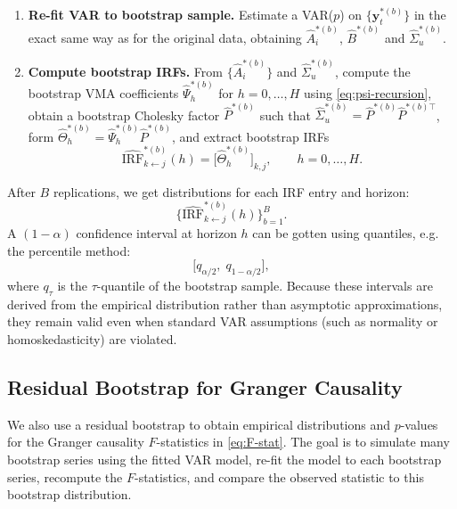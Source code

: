 \documentclass[11pt]{article}
\begin{document}
\begin{enumerate}[leftmargin=1.5em,label=\textbf{(B\arabic*)}]
  \item \textbf{Re-fit VAR to bootstrap sample.}
        Estimate a VAR($p$) on $\{\mathbf{y}_t^{*(b)}\}$ in the exact same
        way as for the original data, obtaining
        $\widehat{A}_i^{*(b)}$, $\widehat{B}^{*(b)}$ and
        $\widehat{\Sigma}_u^{*(b)}$.

  \item \textbf{Compute bootstrap IRFs.}
        From $\{\widehat{A}_i^{*(b)}\}$ and $\widehat{\Sigma}_u^{*(b)}$,
        compute the bootstrap VMA coefficients
        $\widehat{\Psi}_h^{*(b)}$ for $h=0,\dots,H$ using
        \cref{eq:psi-recursion}, obtain a bootstrap Cholesky factor
        $\widehat{P}^{*(b)}$ such that
        $\widehat{\Sigma}_u^{*(b)} = \widehat{P}^{*(b)}
          \widehat{P}^{*(b)\top}$,
        form $\widehat{\Theta}_h^{*(b)} =
          \widehat{\Psi}_h^{*(b)} \widehat{P}^{*(b)}$,
        and extract bootstrap IRFs
        \begin{equation}
          \widehat{\mathrm{IRF}}_{k \leftarrow j}^{*(b)}(h)
          = \big[ \widehat{\Theta}_h^{*(b)} \big]_{k,j},
          \qquad h = 0,\dots,H.
        \end{equation}
\end{enumerate}

After $B$ replications, we get distributions for each IRF
entry and horizon:
\begin{equation}
  \Big\{
    \widehat{\mathrm{IRF}}_{k \leftarrow j}^{*(b)}(h)
  \Big\}_{b=1}^B.
\end{equation}
A $(1-\alpha)$ confidence interval at horizon $h$ can be gotten
using quantiles, e.g. the percentile method:
\begin{equation}
  \Big[
    q_{\alpha/2},
    \;q_{1-\alpha/2}
  \Big],
\end{equation}
where $q_\tau$ is the $\tau$-quantile of the bootstrap sample. Because
these intervals are derived from the empirical distribution rather than
asymptotic approximations, they remain valid even when standard VAR assumptions
(such as normality or homoskedasticity) are violated.  

\subsection{Residual Bootstrap for Granger Causality}  
\label{app:bootstrap-gc}

We also use a residual bootstrap to obtain empirical distributions and
$p$-values for the Granger causality $F$-statistics in
\cref{eq:F-stat}.
The goal is to simulate many bootstrap series using the fitted VAR model,
re-fit the model to each bootstrap series, recompute the $F$-statistics, and
compare the observed statistic to this bootstrap distribution.
\end{document}
